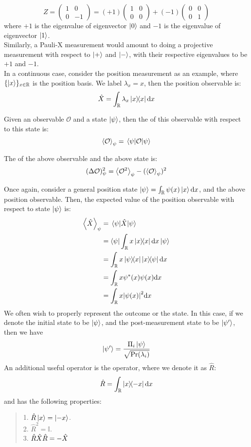 $$Z = \begin{pmatrix}
    1 & 0 \\
    0 & -1
\end{pmatrix} = (+1)\begin{pmatrix}
    1 & 0 \\
    0 & 0
\end{pmatrix} + (-1) \begin{pmatrix}
    0 & 0 \\
    0 & 1
\end{pmatrix}$$
where $+1$ is the eigenvalue of eigenvector $\ket{0}$ and $-1$ is the eigenvalue of eigenvector $\ket{1}$. \\
Similarly, a Pauli-X measurement would amount to doing a projective measurement with respect to $\ket{+}$ and $\ket{-}$, with their respective eigenvalues to be $+1$ and $-1$. \\
In a continuous case, consider the position measurement as an example, where $\{\ket{x}\}_{x \in \mathbb{R}}$ is the position basis. We label $\lambda_x = x$, then the position observable is:
$$\oppos = \intR \lambda_x \dyad{x}{x} \dd x$$
\begin{definition}
    Given an observable $\mathcal{O}$ and a state $\ket{\psi}$, then the  of this observable with respect to this state is:
    $$\expval{\mathcal{O}}_\psi = \ev{\mathcal{O}}{\psi}$$
\end{definition}
\begin{definition}
    The  of the above observable and the above state is:
    $$(\Delta \mathcal{O})_\psi^2 = \expval{\mathcal{O}^2}_\psi - (\expval{\mathcal{O}}_\psi)^2$$
\end{definition}
Once again, consider a general position state $\ket{\psi} = \int_{\mathbb{R}} \psi(x) \ket{x} \dd x$, and the above position observable. Then, the expected value of the position observable with respect to state $\ket{\psi}$ is:
\begin{align*}
    \expval{\oppos}_\psi &= \ev{\oppos}{\psi} \\
    &= \brapsi \intR x \dyad{x}{x} \dd x \ketpsi \\
    &= \intR x \dyad{\psi}{x}\dyad{x}{\psi} \dd x \\
    &= \intR x \conj{\psi}(x) \psi(x) \dd x \\
    &= \intR x \abs{\psi(x)}^2 \dd x
\end{align*}
We often wish to properly represent the outcome or the  state. In this case, if we denote the initial state to be $\ket{\psi}$, and the post-measurement state to be $\ket{\psi'}$, then we have
$$\ket{\psi'} = \frac{\Pi_{i}\ket{\psi}}{\sqrt{\text{Pr}(\lambda_i)}}$$
An additional useful operator is the  operator, where we denote it as $\hat{R}$:
$$\hat{R} = \intR \dyad{x}{-x} \dd x$$
and has the following properties:
\begin{quote}
    1. $\hat{R}\ket{x} = \ket{-x}$. \\
    2. $\hat{R}^2 = \mathbb{I}$. \\
    3. $\hat{R}\hat{X}\hat{R} = -\hat{X}$
\end{quote}

